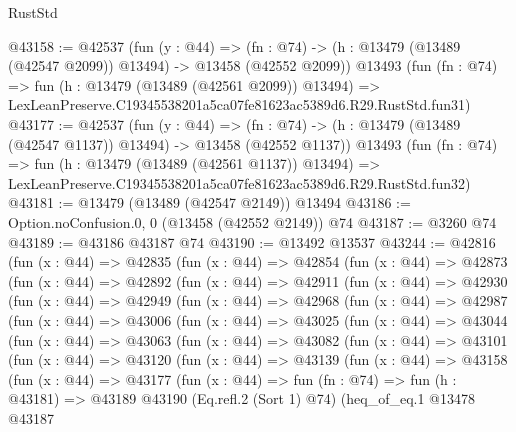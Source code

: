 \begin{lexlean}{RustStd}
\begin{coremodule}
@43158 := @42537
    (fun (y : @44) =>
    (fn : @74) -> (h : @13479 (@13489 (@42547 @2099)) @13494) -> @13458 (@42552 @2099))
    @13493
    (fun (fn : @74) =>
    fun (h : @13479 (@13489 (@42561 @2099)) @13494) =>
    LexLeanPreserve.C19345538201a5ca07fe81623ac5389d6.R29.RustStd.fun31)
@43177 := @42537
    (fun (y : @44) =>
    (fn : @74) -> (h : @13479 (@13489 (@42547 @1137)) @13494) -> @13458 (@42552 @1137))
    @13493
    (fun (fn : @74) =>
    fun (h : @13479 (@13489 (@42561 @1137)) @13494) =>
    LexLeanPreserve.C19345538201a5ca07fe81623ac5389d6.R29.RustStd.fun32)
@43181 := @13479 (@13489 (@42547 @2149)) @13494
@43186 := Option.noConfusion.{0, 0} (@13458 (@42552 @2149)) @74
@43187 := @3260 @74
@43189 := @43186 @43187 @74
@43190 := @13492 @13537
@43244 := @42816
    (fun (x : @44) =>
    @42835
      (fun (x : @44) =>
      @42854
        (fun (x : @44) =>
        @42873
          (fun (x : @44) =>
          @42892
            (fun (x : @44) =>
            @42911
              (fun (x : @44) =>
              @42930
                (fun (x : @44) =>
                @42949
                  (fun (x : @44) =>
                  @42968
                    (fun (x : @44) =>
                    @42987
                      (fun (x : @44) =>
                      @43006
                        (fun (x : @44) =>
                        @43025
                          (fun (x : @44) =>
                          @43044
                            (fun (x : @44) =>
                            @43063
                              (fun (x : @44) =>
                              @43082
                                (fun (x : @44) =>
                                @43101
                                  (fun (x : @44) =>
                                  @43120
                                    (fun (x : @44) =>
                                    @43139
                                      (fun (x : @44) =>
                                      @43158
                                        (fun (x : @44) =>
                                        @43177
                                          (fun (x : @44) =>
                                          fun (fn : @74) =>
                                          fun (h : @43181) =>
                                          @43189
                                            @43190
                                            (Eq.refl.{2} (Sort 1) @74)
                                            (heq_of_eq.{1}
                                              @13478
                                              @43187

\end{coremodule}
\end{lexlean}
